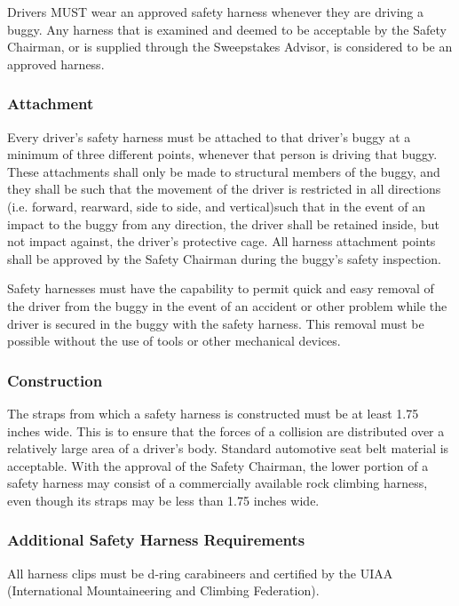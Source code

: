 	Drivers MUST wear an approved safety harness whenever they are driving a buggy.
	Any harness that is examined and deemed to be acceptable by the Safety
	Chairman, or is supplied through the Sweepstakes Advisor, is considered to be
	an approved harness.

\subsubsection{Attachment}

	Every driver's safety harness must be attached to that driver's buggy at a
	minimum of three different points, whenever that person is driving that buggy.
	These attachments shall only be made to structural members of the buggy, and
	they shall be such that the movement of the driver is restricted in all
	directions (i.e. forward, rearward, side to side, and vertical)such that in the
	event of an impact to the buggy from any direction, the driver shall be
	retained inside, but not impact against, the driver's protective cage. All
	harness attachment points shall be approved by the Safety Chairman during the
	buggy's safety inspection.

	Safety harnesses must have the capability to permit quick and easy removal of
	the driver from the buggy in the event of an accident or other problem while
	the driver is secured in the buggy with the safety harness. This removal must
	be possible without the use of tools or other mechanical devices.

\subsubsection{Construction}

	The straps from which a safety harness is constructed must be at least 1.75
	inches wide. This is to ensure that the forces of a collision are distributed
	over a relatively large area of a driver's body. Standard automotive seat belt
	material is acceptable. With the approval of the Safety Chairman, the lower
	portion of a safety harness may consist of a commercially available rock
	climbing harness, even though its straps may be less than 1.75 inches wide.

\subsubsection{Additional Safety Harness Requirements}
	
	All harness clips must be d-ring carabineers and certified by the UIAA
	(International Mountaineering and Climbing Federation).

